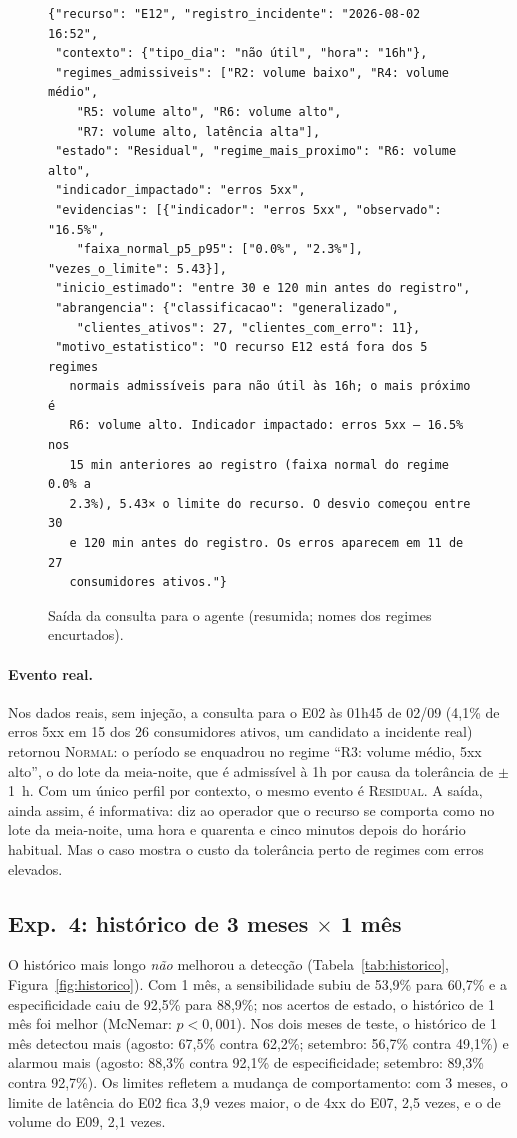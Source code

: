 \documentclass[sigconf,nonacm]{acmart}
\newcommand{\Normal}{\textsc{Normal}\xspace}
\newcommand{\Residual}{\textsc{Residual}\xspace}
\begin{document}
\begin{figure}[t]
\begin{Verbatim}[fontsize=\scriptsize,frame=single]
{"recurso": "E12", "registro_incidente": "2026-08-02 16:52",
 "contexto": {"tipo_dia": "não útil", "hora": "16h"},
 "regimes_admissiveis": ["R2: volume baixo", "R4: volume médio",
    "R5: volume alto", "R6: volume alto",
    "R7: volume alto, latência alta"],
 "estado": "Residual", "regime_mais_proximo": "R6: volume alto",
 "indicador_impactado": "erros 5xx",
 "evidencias": [{"indicador": "erros 5xx", "observado": "16.5%",
    "faixa_normal_p5_p95": ["0.0%", "2.3%"], "vezes_o_limite": 5.43}],
 "inicio_estimado": "entre 30 e 120 min antes do registro",
 "abrangencia": {"classificacao": "generalizado",
    "clientes_ativos": 27, "clientes_com_erro": 11},
 "motivo_estatistico": "O recurso E12 está fora dos 5 regimes
   normais admissíveis para não útil às 16h; o mais próximo é
   R6: volume alto. Indicador impactado: erros 5xx — 16.5% nos
   15 min anteriores ao registro (faixa normal do regime 0.0% a
   2.3%), 5.43× o limite do recurso. O desvio começou entre 30
   e 120 min antes do registro. Os erros aparecem em 11 de 27
   consumidores ativos."}
\end{Verbatim}
\caption{Saída da consulta para o agente (resumida; nomes dos regimes encurtados).}
\label{fig:json}
\end{figure}

\paragraph{Evento real.} Nos dados reais, sem injeção, a consulta para o E02 às 01h45 de 02/09 (4,1\% de erros 5xx em 15 dos 26 consumidores ativos, um candidato a incidente real) retornou \Normal: o período se enquadrou no regime ``R3: volume médio, 5xx alto'', o do lote da meia-noite, que é admissível à 1h por causa da tolerância de $\pm$1~h. Com um único perfil por contexto, o mesmo evento é \Residual. A saída, ainda assim, é informativa: diz ao operador que o recurso se comporta como no lote da meia-noite, uma hora e quarenta e cinco minutos depois do horário habitual. Mas o caso mostra o custo da tolerância perto de regimes com erros elevados.

\subsection{Exp.~4: histórico de 3 meses $\times$ 1 mês}
O histórico mais longo \emph{não} melhorou a detecção (Tabela~\ref{tab:historico}, Figura~\ref{fig:historico}). Com 1 mês, a sensibilidade subiu de 53,9\% para 60,7\% e a especificidade caiu de 92,5\% para 88,9\%; nos acertos de estado, o histórico de 1 mês foi melhor (McNemar: $p<0{,}001$). Nos dois meses de teste, o histórico de 1 mês detectou mais (agosto: 67,5\% contra 62,2\%; setembro: 56,7\% contra 49,1\%) e alarmou mais (agosto: 88,3\% contra 92,1\% de especificidade; setembro: 89,3\% contra 92,7\%). Os limites refletem a mudança de comportamento: com 3 meses, o limite de latência do E02 fica 3,9 vezes maior, o de 4xx do E07, 2,5 vezes, e o de volume do E09, 2,1 vezes.
\end{document}
